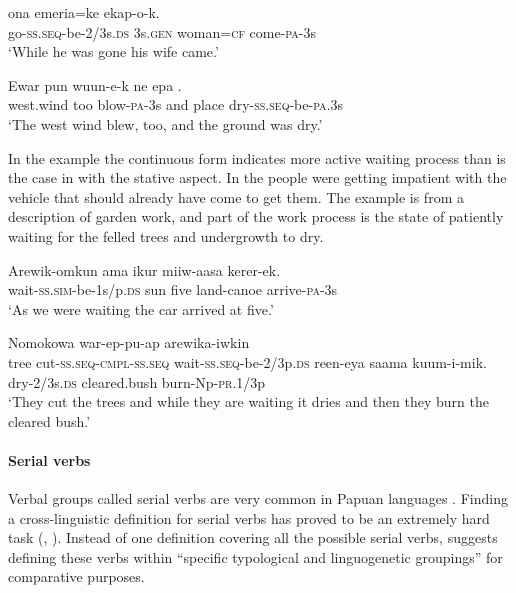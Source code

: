 \ea%
\label{ex:3:x358}
\gll {} ona emeria=ke ekap-o-k. \\
go-\textsc{ss}.\textsc{seq}-be-2/3s.\textsc{ds} 3s.\textsc{gen} woman=\textsc{cf} come-\textsc{pa}-3s\\
\glt`While he was gone his wife came.'
\z

\ea%
\label{ex:3:x1047}
\gll Ewar pun wuun-e-k ne epa . \\
west.wind too blow-\textsc{pa}-3s and place dry-\textsc{ss}.\textsc{seq}-be-\textsc{pa}.3s\\
\glt`The west wind blew, too, and the ground was dry.'
\z

In the example  the continuous form indicates more active waiting process than is the case in  with the stative aspect. In  the people were getting impatient with the vehicle that should already have come to get them. The example  is from a description of garden work, and part of the work process is the state of patiently waiting for the felled trees and undergrowth to dry. 

\ea%
\label{ex:3:x359}
\gll Arewik-omkun ama ikur miiw-aasa kerer-ek. \\
wait-\textsc{ss}.\textsc{sim}-be-1s/p.\textsc{ds} sun five land-canoe arrive-\textsc{pa}-3s\\
\glt`As we were waiting the car arrived at five.'
\z

\ea%
\label{ex:3:x360}
\gll Nomokowa war-ep-pu-ap arewika-iwkin \\
tree cut-\textsc{ss}.\textsc{seq}-\textsc{cmpl}-\textsc{ss}.\textsc{seq} wait-\textsc{ss}.\textsc{seq}-be-2/3p.\textsc{ds}
reen-eya saama kuum-i-mik.
dry-2/3s.\textsc{ds} cleared.bush burn-Np-\textsc{pr}.1/3p\\
\glt`They cut the trees and while they are waiting it dries and then they burn the cleared bush.' 
\z

\paragraph{Serial verbs} \label{sec:3:a:z:y:x}
{}
Verbal groups called serial verbs are very common in Papuan languages \citep[116]{Foley1986}. Finding a cross-linguistic definition for serial verbs has proved to be an extremely hard task (\citealt[5]{Sebba1987}, \citealt[1]{Lord1993}). Instead of one definition covering all the possible serial verbs, \citet[19]{Crowley2002} suggests defining these verbs within ``{specific typological and linguogenetic groupings}'' for comparative purposes. 

